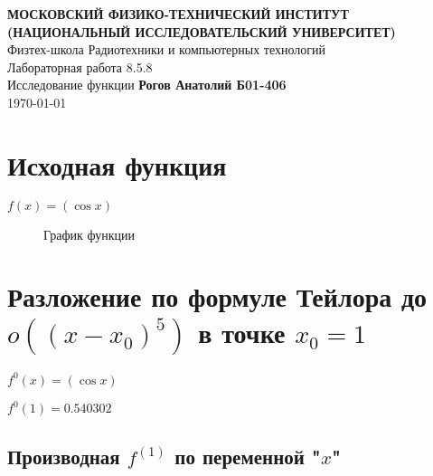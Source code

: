 \documentclass[12pt, letterpaper]{report}
\begin{document}
\begin{titlepage}
\begin{center}
\vspace*{1cm}
\textbf{МОСКОВСКИЙ ФИЗИКО-ТЕХНИЧЕСКИЙ ИНСТИТУТ (НАЦИОНАЛЬНЫЙ ИССЛЕДОВАТЕЛЬСКИЙ УНИВЕРСИТЕТ)}\\
\vspace{0.5cm} Физтех-школа Радиотехники и компьютерных технологий\\
\vspace{5cm} \LARGE{Лабораторная работа 8.5.8\\
Исследование функции}
\vfill
\large{\textbf{Рогов Анатолий Б01-406}} \\
\large \today
\vspace{0.8cm}
\end{center}
\end{titlepage}
\chapter{Исходная функция}
\hfil $f(x) = (\cos{x})$\\
\begin{figure}[h]
\centering
{}
\caption{График функции}
\end{figure}
\chapter{Разложение по формуле Тейлора до \\ $o((x - x_0)^{5})$ в точке $x_0 = 1$}
\begin{center} $f^{0}(x) = (\cos{x})$ \end{center}
\begin{center} $f^{0}(1) = 0.540302$ \end{center}
\section{Производная $f^{(1)}$ по переменной "$x$"}
\renewcommand{\thesubsection}{\arabic{subsection}}
\titleformat{\subsection}{\normalfont\bfseries}{}{0em}{#1\ \thesubsection}
\end{document}
